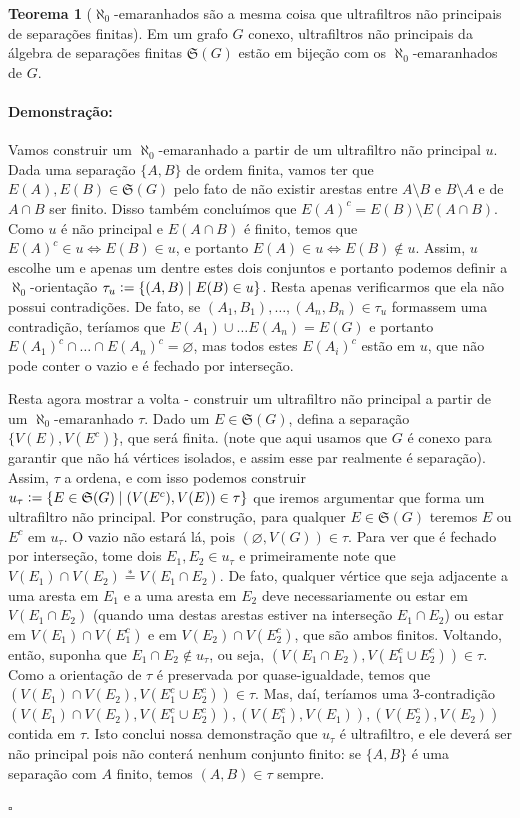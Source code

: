 \documentclass[11pt]{article}
\newcommand{\defeq}{\vcentcolon=}
\newcommand{\pulinho}{\vspace{.5cm}}
\theoremstyle{definition}
\newtheorem{theorem}{Teorema}
\newenvironment{teorema}{
\definecolor{shadecolor}{HTML}{f59aa3}
\begin{shaded}
\begin{theorem}
}
{
\end{theorem}
\end{shaded}
}
\theoremstyle{definition}
\theoremstyle{definition}
\theoremstyle{definition}
\theoremstyle{definition}
\theoremstyle{definition}
\theoremstyle{definition}
\theoremstyle{definition}
\theoremstyle{definition}
\theoremstyle{definition}
\theoremstyle{definition}
\theoremstyle{definition}
\newenvironment{prova}{\paragraph{Demonstração:}}{\hfill$\square$ 
\pulinho
}
\newcommand{\almostequal}{\stackrel{*}{=}}
\begin{document}
\begin{teorema}[$\aleph_0$-emaranhados são a mesma coisa que ultrafiltros não principais de separações finitas]
Em um grafo $G$ conexo, ultrafiltros não principais da álgebra de separações finitas $\mathfrak{S}(G)$ estão em bijeção com os $\aleph_0$-emaranhados de $G$.
\end{teorema}
\begin{prova}
Vamos construir um $\aleph_0$-emaranhado a partir de um ultrafiltro não principal $u$. Dada uma separação $\{A,B\}$ de ordem finita, vamos ter que $E(A),E(B) \in \mathfrak{S}(G)$ pelo fato de não existir arestas entre $A \setminus B$ e $B \setminus A$ e de $A \cap B$ ser finito. Disso também concluímos que $E(A)^c = E(B) \setminus E(A \cap B)$. Como $u$ é não principal e $E(A\cap B)$ é finito, temos que $E(A)^c \in u \iff E(B) \in u$, e portanto $E(A) \in u \iff E(B) \notin u$. Assim, $u$ escolhe um e apenas um dentre estes dois conjuntos e portanto podemos definir a $\aleph_0$-orientação $\tau_u \defeq \{(A,B) \mid E(B) \in u\}$. Resta apenas verificarmos que ela não possui contradições. De fato, se $(A_1,B_1), \dots, (A_n,B_n) \in \tau_u$ formassem uma contradição, teríamos que $E(A_1) \cup \dots E(A_n) = E(G)$ e portanto $E(A_1)^c \cap \dots \cap E(A_n)^c = \varnothing$, mas todos estes $E(A_i)^c$ estão em $u$, que não pode conter o vazio e é fechado por interseção.

Resta agora mostrar a volta - construir um ultrafiltro não principal a partir de um $\aleph_0$-emaranhado $\tau$. Dado um $E \in \mathfrak{S}(G)$, defina a separação $\{V(E),V(E^c)\}$, que será finita. (note que aqui usamos que $G$ é conexo para garantir que não há vértices isolados, e assim esse par realmente é separação). Assim, $\tau$ a ordena, e com isso podemos construir $u_\tau \defeq \{E \in \mathfrak{S}(G) \mid (V(E^c),V(E)) \in \tau \}$ que iremos argumentar que forma um ultrafiltro não principal. Por construção, para qualquer $E \in \mathfrak{S}(G)$ teremos $E$ ou $E^c$ em $u_\tau$. O vazio não estará lá, pois $(\varnothing, V(G)) \in \tau$. Para ver que é fechado por interseção, tome dois $E_1,E_2 \in u_\tau$ e primeiramente note que $V(E_1) \cap V(E_2) \almostequal V(E_1 \cap E_2)$. De fato, qualquer vértice que seja adjacente a uma aresta em $E_1$ e a uma aresta em $E_2$ deve necessariamente ou estar em $V(E_1 \cap E_2)$ (quando uma destas arestas estiver na interseção $E_1 \cap E_2$) ou estar em $V(E_1)\cap V(E_1^c)$ e em $V(E_2) \cap V(E_2^c)$, que são ambos finitos. Voltando, então, suponha que $E_1 \cap E_2 \notin u_\tau$, ou seja, $(V(E_1 \cap E_2), V(E_1^c \cup E_2^c))\in \tau$. Como a orientação de $\tau$ é preservada por quase-igualdade, temos que $(V(E_1) \cap V(E_2), V(E_1^c \cup E_2^c))\in \tau$. Mas, daí, teríamos uma $3$-contradição $(V(E_1) \cap V(E_2), V(E_1^c \cup E_2^c)), (V(E_1^c),V(E_1)), (V(E_2^c),V(E_2))$ contida em $\tau$. Isto conclui nossa demonstração que $u_\tau$ é ultrafiltro, e ele deverá ser não principal pois não conterá nenhum conjunto finito: se $\{A,B\}$ é uma separação com $A$ finito, temos $(A,B)\in \tau$ sempre.


\end{prova}
\end{document}
